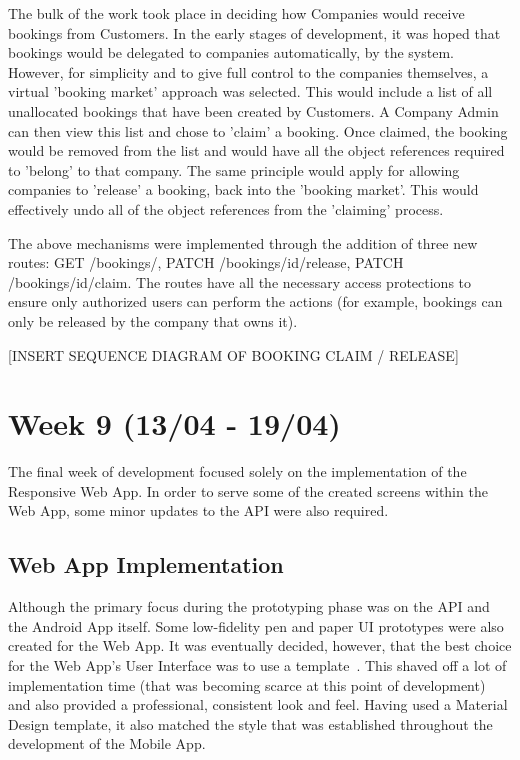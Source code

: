 The bulk of the work took place in deciding how Companies would receive bookings from Customers. In the early stages of development, it was hoped that bookings would be delegated to companies automatically, by the system. However, for simplicity and to give full control to the companies themselves, a virtual 'booking market' approach was selected. This would include a list of all unallocated bookings that have been created by Customers. A Company Admin can then view this list and chose to 'claim' a booking. Once claimed, the booking would be removed from the list and would have all the object references required to 'belong' to that company. The same principle would apply for allowing companies to 'release' a booking, back into the 'booking market'. This would effectively undo all of the object references from the 'claiming' process.

The above mechanisms were implemented through the addition of three new routes: GET /bookings/, PATCH /bookings/{id}/release, PATCH /bookings/{id}/claim. The routes have all the necessary access protections to ensure only authorized users can perform the actions (for example, bookings can only be released by the company that owns it).

[INSERT SEQUENCE DIAGRAM OF BOOKING CLAIM / RELEASE]

\section{Week 9 (13/04 - 19/04)}
The final week of development focused solely on the implementation of the Responsive Web App. In order to serve some of the created screens within the Web App, some minor updates to the API were also required.

\subsection{Web App Implementation}
Although the primary focus during the prototyping phase was on the API and the Android App itself. Some low-fidelity pen and paper UI prototypes were also created for the Web App. It was eventually decided, however, that the best choice for the Web App's User Interface was to use a template~\cite{angular_material_documentation_ref}. This shaved off a lot of implementation time (that was becoming scarce at this point of development) and also provided a professional, consistent look and feel. Having used a Material Design template, it also matched the style that was established throughout the development of the Mobile App.


